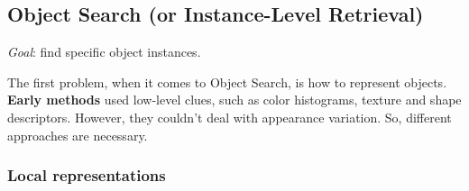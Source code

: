 \subsection{Object Search (or Instance-Level Retrieval)}\label{sec:vs-object}

\textit{Goal}: find specific object instances.

The first problem, when it comes to Object Search, is how to represent objects.\\
\textbf{Early methods} used low-level clues, such as color histograms, texture and shape descriptors. However, they couldn't deal with appearance variation. So, different approaches are necessary.


\subsubsection{Local representations}\label{sec:vs-local}

